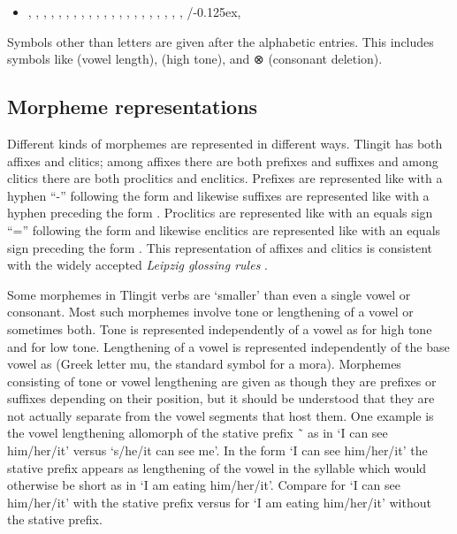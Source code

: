 \documentclass[12pt,letterpaper,oneside,article]{memoir}
\begin{document}
\begin{itemize}
\item	{},
	,
	,
	,
	,
	,
	,
	,
	,
	,
	,
	,
	,
	,
	,
	,
	,
	,
	,
	,
	,
	/\kern-0.125ex,
\end{itemize}

Symbols other than letters are given after the alphabetic entries.
This includes symbols like  (vowel length),  (high tone), and ⊗ (consonant deletion). 

\subsection{Morpheme representations}\label{sec:intro-morphrep}

Different kinds of morphemes are represented in different ways.
Tlingit has both affixes and clitics; among affixes there are both prefixes and suffixes and among clitics there are both proclitics and enclitics.
Prefixes are represented like  with a hyphen “-” following the form  and likewise suffixes are represented like  with a hyphen preceding the form .
Proclitics are represented like  with an equals sign “=” following the form  and likewise enclitics are represented like  with an equals sign preceding the form .
This representation of affixes and clitics is consistent with the widely accepted \textit{Leipzig glossing rules} \parencite{comrie:2008}.

Some morphemes in Tlingit verbs are ‘smaller’ than even a single vowel or consonant.
Most such morphemes involve tone or lengthening of a vowel or sometimes both.
Tone is represented independently of a vowel as  for high tone and  for low tone.
Lengthening of a vowel is represented independently of the base vowel as  (Greek letter mu, the standard symbol for a mora).
Morphemes consisting of tone or vowel lengthening are given as though they are prefixes or suffixes depending on their position, but it should be understood that they are not actually separate from the  vowel segments that host them.
One example is the vowel lengthening allomorph  of the stative prefix  \~\  as in  ‘I can see him/her/it’ versus  ‘s/he/it can see me’.
In the form  ‘I can see him/her/it’ the stative prefix appears as lengthening of the vowel in the  syllable which would otherwise be short  as in  ‘I am eating him/her/it’.
Compare  for  ‘I can see him/her/it’ with the  stative prefix versus  for  ‘I am eating him/her/it’ without the  stative prefix.
\end{document}
